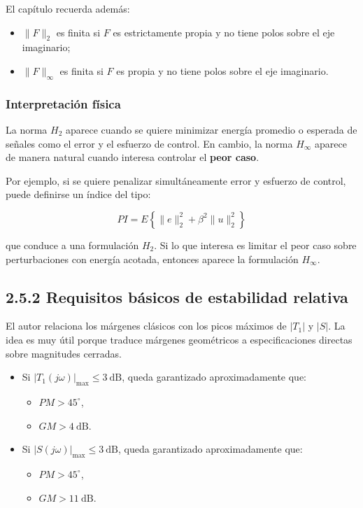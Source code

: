 El capítulo recuerda además:

\begin{itemize}
  \item \(\|F\|_2\) es finita si \(F\) es estrictamente propia y no tiene polos sobre el eje imaginario;
  \item \(\|F\|_\infty\) es finita si \(F\) es propia y no tiene polos sobre el eje imaginario.
\end{itemize}

\subsubsection{Interpretación física}
La norma \(H_2\) aparece cuando se quiere minimizar energía promedio o esperada de señales como el error y el esfuerzo de control. En cambio, la norma \(H_\infty\) aparece de manera natural cuando interesa controlar el \textbf{peor caso}.

Por ejemplo, si se quiere penalizar simultáneamente error y esfuerzo de control, puede definirse un índice del tipo:

$$
PI = E\left\{\|e\|_2^2+\beta^2\|u\|_2^2\right\}
$$

que conduce a una formulación \(H_2\). Si lo que interesa es limitar el peor caso sobre perturbaciones con energía acotada, entonces aparece la formulación \(H_\infty\).

\subsection{2.5.2 Requisitos básicos de estabilidad relativa}
El autor relaciona los márgenes clásicos con los picos máximos de \(|T_1|\) y \(|S|\). La idea es muy útil porque traduce márgenes geométricos a especificaciones directas sobre magnitudes cerradas.

\begin{itemize}
  \item Si \(|T_1(j\omega)|_{\max}\le 3\ \text{dB}\), queda garantizado aproximadamente que:

  \begin{itemize}
    \item \(PM>45^\circ\),
    \item \(GM>4\ \text{dB}\).
  \end{itemize}
  \item Si \(|S(j\omega)|_{\max}\le 3\ \text{dB}\), queda garantizado aproximadamente que:

  \begin{itemize}
    \item \(PM>45^\circ\),
    \item \(GM>11\ \text{dB}\).
  \end{itemize}
\end{itemize}

